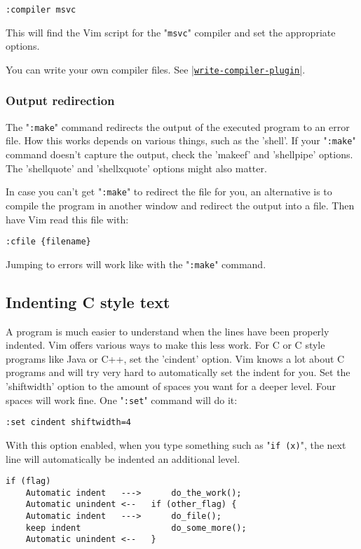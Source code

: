 \begin{Verbatim}[samepage=true]
 :compiler msvc
\end{Verbatim}

This will find the Vim script for the "\verb!msvc!" compiler and set the appropriate options.

You can write your own compiler files.  See \hyperref[write-compiler-plugin]{|\texttt{write-compiler-plugin}|}.

\subsubsection{Output redirection}
The "\verb!:make!" command redirects the output of the executed program to an error file.
How this works depends on various things, such as the 'shell'.
If your "\verb!:make!" command doesn't capture the output, check the 'makeef' and 'shellpipe' options.
The 'shellquote' and 'shellxquote' options might also matter.

In case you can't get "\verb!:make!" to redirect the file for you, an alternative is to compile the program in another window and redirect the output into a file.
Then have Vim read this file with:

\begin{Verbatim}[samepage=true]
 :cfile {filename}
\end{Verbatim}

Jumping to errors will work like with the "\verb!:make!" command.
\subsection{Indenting C style text}
A program is much easier to understand when the lines have been properly indented.
Vim offers various ways to make this less work.
For C or C style programs like Java or C++, set the 'cindent' option.
Vim knows a lot about C programs and will try very hard to automatically set the indent for you.
Set the 'shiftwidth' option to the amount of spaces you want for a deeper level.
Four spaces will work fine.
One "\verb!:set!" command will do it:

\begin{Verbatim}[samepage=true]
 :set cindent shiftwidth=4
\end{Verbatim}

With this option enabled, when you type something such as "\verb!if (x)!", the next line will automatically be indented an additional level.

\begin{Verbatim}[samepage=true]
                             if (flag)
    Automatic indent   --->      do_the_work();
    Automatic unindent <--   if (other_flag) {
    Automatic indent   --->      do_file();
    keep indent                  do_some_more();
    Automatic unindent <--   }
\end{Verbatim}

